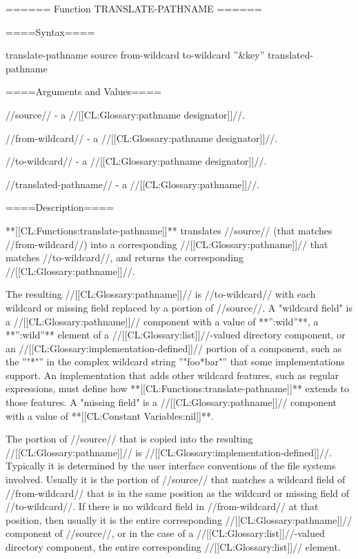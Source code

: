 ====== Function TRANSLATE-PATHNAME ======

====Syntax====

\DefunWithValuesNewline translate-pathname {source from-wildcard to-wildcard ''&key''} {translated-pathname}

====Arguments and Values====

//source// - a //[[CL:Glossary:pathname designator]]//.

//from-wildcard// - a //[[CL:Glossary:pathname designator]]//.

//to-wildcard// - a //[[CL:Glossary:pathname designator]]//.

//translated-pathname// - a //[[CL:Glossary:pathname]]//.

====Description====

**[[CL:Functions:translate-pathname]]** translates //source// (that matches //from-wildcard//) into a corresponding //[[CL:Glossary:pathname]]// that matches //to-wildcard//, and returns the corresponding //[[CL:Glossary:pathname]]//.

The resulting //[[CL:Glossary:pathname]]// is //to-wildcard// with each wildcard or missing field replaced by a portion of //source//. A "wildcard field" is a //[[CL:Glossary:pathname]]// component with a value of **'':wild''**, a **'':wild''** element of a //[[CL:Glossary:list]]//-valued directory component, or an //[[CL:Glossary:implementation-defined]]// portion of a component, such as the ''"*"'' in the complex wildcard string ''"foo*bar"'' that some implementations support. An implementation that adds other wildcard features, such as regular expressions, must define how **[[CL:Functions:translate-pathname]]** extends to those features. A "missing field" is a //[[CL:Glossary:pathname]]// component with a value of **[[CL:Constant Variables:nil]]**.

The portion of //source// that is copied into the resulting //[[CL:Glossary:pathname]]// is //[[CL:Glossary:implementation-defined]]//. Typically it is determined by the user interface conventions of the file systems involved. Usually it is the portion of //source// that matches a wildcard field of //from-wildcard// that is in the same position as the wildcard or missing field of //to-wildcard//. If there is no wildcard field in //from-wildcard// at that position, then usually it is the entire corresponding //[[CL:Glossary:pathname]]// component of //source//, or in the case of a //[[CL:Glossary:list]]//-valued directory component, the entire corresponding //[[CL:Glossary:list]]// element.

